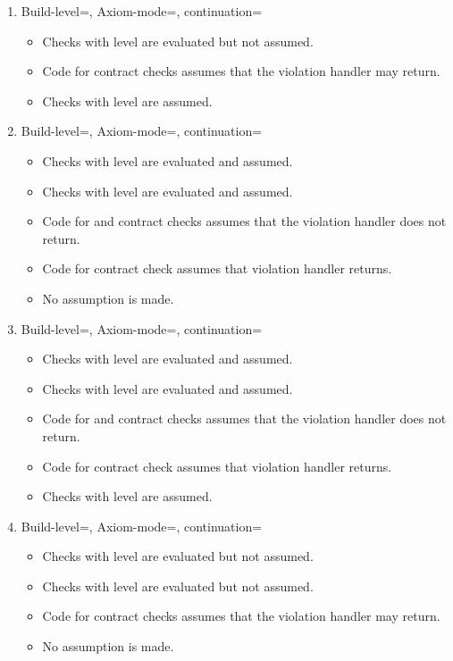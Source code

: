 \begin{enumerate}
\item Build-level=, Axiom-mode=, continuation=
\begin{itemize}
  \item Checks with  level are evaluated but not assumed.
  \item Code for contract checks assumes that the violation handler may return.
  \item Checks with  level are assumed.
\end{itemize}

\item Build-level=, Axiom-mode=, continuation=
\begin{itemize}
  \item Checks with  level are evaluated and assumed.
  \item Checks with  level are evaluated and assumed.
  \item Code for  and  contract checks 
	  assumes that the violation handler does not return.
  \item Code for  contract check assumes that violation handler
	  returns.
  \item No assumption is made.
\end{itemize}

\item Build-level=, Axiom-mode=, continuation=
\begin{itemize}
  \item Checks with  level are evaluated and assumed.
  \item Checks with  level are evaluated and assumed.
  \item Code for  and  contract checks 
	  assumes that the violation handler does not return.
  \item Code for  contract check assumes that violation handler
	  returns.
  \item Checks with  level are assumed.
\end{itemize}

\item Build-level=, Axiom-mode=, continuation=
\begin{itemize}
  \item Checks with  level are evaluated but not assumed.
  \item Checks with  level are evaluated but not assumed.
  \item Code for contract checks assumes that the violation handler may return.
  \item No assumption is made.
\end{itemize}


\end{enumerate}
